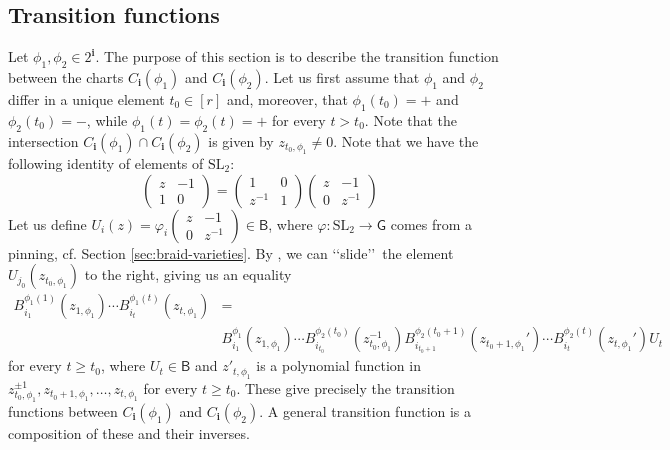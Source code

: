 \documentclass[a4paper, 11pt]{amsart}
\newcommand{\SL}{\mathrm{SL}}
\newcommand{\borel}{\mathsf{B}}
\newcommand{\word}[1]{\mathbf{#1}}
\newcommand{\group}{\mathsf{G}}
\theoremstyle{definition}
\begin{document}
\subsection{Transition functions} Let $\phi_1, \phi_2 \in 2^{\word{i}}$. The purpose of this section is to describe the transition function between the charts $C_{\word{i}}(\phi_1)$ and $C_{\word{i}}(\phi_2)$. Let us first assume that $\phi_1$ and $\phi_2$ differ in a unique element $t_0 \in [r]$ and, moreover, that $\phi_1(t_0) = +$ and $\phi_2(t_0) = -$, while $\phi_1(t) = \phi_2(t) = +$ for every $t > t_0$. Note that the intersection $C_{\word{i}}(\phi_1)\cap C_{\word{i}}(\phi_2)$ is given by $z_{t_0, \phi_1} \neq 0$. Note that we have the following identity of elements of $\SL_2$:
\[
\begin{pmatrix}
z & -1 \\ 1 & 0 
\end{pmatrix} =
\begin{pmatrix}
1 & 0 \\
z^{-1} & 1 
\end{pmatrix}
\begin{pmatrix}
z & -1 \\
0 & z^{-1}
\end{pmatrix}
\]
Let us define $U_i(z) = \varphi_i\begin{pmatrix} z & -1 \\ 0 & z^{-1}\end{pmatrix} \in \borel$, where $\varphi: \SL_2 \to \group$ comes from a pinning, cf. Section \ref{sec:braid-varieties}. By \cite[Corollary 3.9]{CGGLSS}, we can \lq\lq slide\rq\rq \, the element $U_{j_0}(z_{t_0, \phi_1})$ to the right, giving us an equality
\begin{equation}\label{eq:transition-function}
\begin{array}{rl}
B_{i_1}^{\phi_1(1)}(z_{1, \phi_1})\cdots B_{i_t}^{\phi_1(t)}(z_{t, \phi_1}) & = \\ & B_{i_1}^{\phi_1}(z_{1, \phi_1})\cdots B_{i_{t_0}}^{\phi_2(t_0)}(z_{t_0, \phi_1}^{-1})B_{i_{t_0+1}}^{\phi_2(t_0+1)}(z_{t_0+1, \phi_1}')\cdots B^{\phi_2(t)}_{i_{t}}(z_{t, \phi_1}')U_{t}
\end{array}
\end{equation}
for every $t \geq t_0$, where $U_t \in \borel$ and $z'_{t, \phi_1}$ is a polynomial function in $z_{t_0, \phi_1}^{\pm 1}, z_{t_0+1, \phi_1}, \dots, z_{t, \phi_1}$ for every $t \geq t_0$. These give precisely the transition functions between $C_{\word{i}}(\phi_1)$ and $C_{\word{i}}(\phi_2)$. A general transition function is a composition of these and their inverses.
\end{document}
